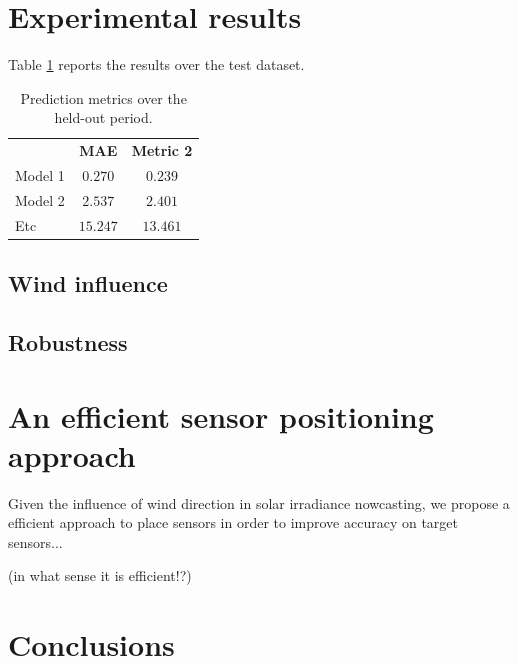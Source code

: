 \documentclass[preprints,article,accept,moreauthors,pdftex]{template/mdpi}
\begin{document}
\section{Experimental results}\label{sec:results}

Table \ref{tbl:preds} reports the results over the test dataset.

\begin{table}[!ht]
\centering
\caption{Prediction metrics over the held-out period.}\label{tbl:preds}
\begin{tabular}{lcc}
\cline{1-3}
   & \textbf{MAE}                             & \textbf{Metric 2}   \\ 
 \cline{1-3}
    Model 1          & $0.270$ &  $0.239$ \\
    Model 2          & $2.537$ &  $2.401$ \\
    Etc & $15.247$ & $13.461$\\
 \cline{1-3}
\end{tabular}
\end{table}



\subsection{Wind influence}\label{subsec:wind}



\subsection{Robustness}\label{subsec:robust}


\section{An efficient sensor positioning approach}\label{sec:positioning}
Given the influence of wind direction in solar irradiance nowcasting, we propose a efficient approach to place sensors in order to improve accuracy on target sensors...

(in what sense it is efficient!?)

\section{Conclusions}\label{sec:conclusions}
\end{document}
